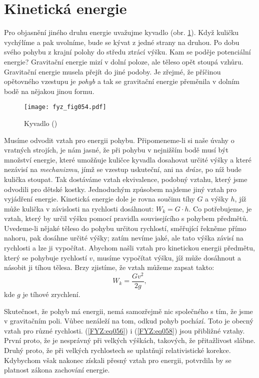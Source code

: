 {  \section{Kinetická energie}
    Pro objasnění jiného druhu energie uvažujme kyvadlo (obr. \ref{fyz:fig054}). Když kuličku 
    vychýlíme a pak uvolníme, bude se kývat z jedné strany na druhou. Po dobu svého pohybu z krajní 
    polohy do středu ztrácí výšku. Kam se poděje potenciální energie? Gravitační energie mizí v 
    dolní poloze, ale těleso opět stoupá vzhůru. Gravitační energie musela přejít do jiné podoby. 
    Je zřejmé, že příčinou opětovného vzestupu je \emph{pohyb} a tak se gravitační energie 
    přeměnila v dolním bodě na nějakou jinou formu.
    
    \begin{figure}[ht!]  %
      \centering
      \texttt{[image: fyz\_fig054.pdf]}
      \caption{Kyvadlo (\cite[s.~56]{Feynman01})}
      \label{fyz:fig054}
    \end{figure}
    Musíme odvodit vztah pro energii pohybu. Připomeneme-li si naše úvahy o vratných strojích, je 
    nám jasné, že při pohybu v nejnižším bodě musí být množství energie, které umožňuje kuličce 
    kyvadla dosahovat určité výšky a které nezávisí na \emph{mechanizmu}, jímž se vzestup 
    uskuteční, ani na \emph{dráze}, po níž bude kulička stoupat. Tak dostáváme vztah ekvivalence, 
    podobný vztahu, který jsme odvodili pro dětské kostky. Jednoduchým způsobem najdeme jiný vztah 
    pro vyjádření energie. Kinetická energie dole je rovna součinu tíhy \(G\) a výšky \(h\), jíž 
    může kulička v závislosti na rychlosti dosáhnout: \(W_k=G\cdot h\). Co potřebujeme, je vztah, 
    který by určil výšku pomocí pravidla souvisejícího s pohybem předmětů. Uvedeme-li nějaké těleso 
    do pohybu určitou rychlostí, směřující řekněme přímo nahoru, pak dosáhne určité výšky; zatím 
    nevíme jaké, ale tato výška závisí na rychlosti a lze ji vypočítat. Abychom našli vztah pro 
    kinetickou energii předmětu, který se pohybuje rychlostí \(v\), musíme vypočítat výšku, jíž 
    může dosáhnout a násobit ji tíhou tělesa. Brzy zjistíme, že vztah můžeme zapsat takto:
    \begin{equation}\label{FYZ:eq058}
      W_k = \frac{Gv^2}{2g},
    \end{equation}
    kde \(g\) je tíhové zrychlení.
    
    Skutečnost, že pohyb má energii, nemá samozřejmě nic společného s tím, že jsme v gravitačním 
    poli. Vůbec nezáleží na tom, odkud pohyb pochází. Toto je obecný vztah pro různé rychlosti. 
    (\ref{FYZ:eq056}) i (\ref{FYZ:eq058}) jsou přibližné vztahy. První proto, že je nesprávný při 
    velkých výškách, takových, že přitažlivost slábne. Druhý proto, že při velkých rychlostech se 
    uplatňují relativistické korekce. Kdybychom však nakonec získali přesný vztah pro energii, 
    potvrdila by se platnost zákona zachování energie.

}
